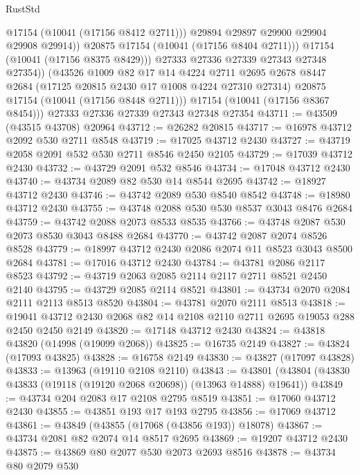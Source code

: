 \begin{lexlean}{RustStd}
\begin{coremodule}
                    @17154
                    (@10041 (@17156 @8412 @2711)))
                  @29894
                  @29897
                  @29900
                  @29904
                  @29908
                  @29914))
              @20875
              @17154
              (@10041 (@17156 @8404 @2711)))
            @17154
            (@10041 (@17156 @8375 @8429)))
          @27333
          @27336
          @27339
          @27343
          @27348
          @27354))
      (@43526
        @1009
        @82
        @17
        @14
        @4224
        @2711
        @2695
        @2678
        @8447
        @2684
        (@17125 @20815 @2430 @17 @1008 @4224 @27310 @27314)
        @20875
        @17154
        (@10041 (@17156 @8448 @2711)))
      @17154
      (@10041 (@17156 @8367 @8454)))
    @27333
    @27336
    @27339
    @27343
    @27348
    @27354
@43711 := @43509 (@43515 @43708) @20964
@43712 := @26282 @20815
@43717 := @16978 @43712 @2092 @530 @2711 @8548
@43719 := @17025 @43712 @2430
@43727 := @43719 @2058 @2091 @532 @530 @2711 @8546 @2450 @2105
@43729 := @17039 @43712 @2430
@43732 := @43729 @2091 @532 @8546
@43734 := @17048 @43712 @2430
@43740 := @43734 @2089 @82 @530 @14 @8544 @2695
@43742 := @18927 @43712 @2430
@43746 := @43742 @2089 @530 @8540 @8542
@43748 := @18980 @43712 @2430
@43755 := @43748 @2088 @530 @530 @8537 @3043 @8476 @2684
@43759 := @43742 @2088 @2073 @8533 @8535
@43766 := @43748 @2087 @530 @2073 @8530 @3043 @8488 @2684
@43770 := @43742 @2087 @2074 @8526 @8528
@43779 := @18997 @43712 @2430 @2086 @2074 @11 @8523 @3043 @8500 @2684
@43781 := @17016 @43712 @2430
@43784 := @43781 @2086 @2117 @8523
@43792 := @43719 @2063 @2085 @2114 @2117 @2711 @8521 @2450 @2140
@43795 := @43729 @2085 @2114 @8521
@43801 := @43734 @2070 @2084 @2111 @2113 @8513 @8520
@43804 := @43781 @2070 @2111 @8513
@43818 := @19041 @43712 @2430 @2068 @82 @14 @2108 @2110 @2711 @2695 @19053 @288 @2450 @2450 @2149
@43820 := @17148 @43712 @2430
@43824 := @43818 @43820 (@14998 (@19099 @2068))
@43825 := @16735 @2149
@43827 := @43824 (@17093 @43825)
@43828 := @16758 @2149
@43830 := @43827 (@17097 @43828)
@43833 := @13963 (@19110 @2108 @2110)
@43843 := @43801 (@43804 (@43830 @43833 (@19118 (@19120 @2068 @20698)) (@13963 @14888) @19641))
@43849 := @43734 @204 @2083 @17 @2108 @2795 @8519
@43851 := @17060 @43712 @2430
@43855 := @43851 @193 @17 @193 @2795
@43856 := @17069 @43712
@43861 := @43849 (@43855 (@17068 (@43856 @193)) @18078)
@43867 := @43734 @2081 @82 @2074 @14 @8517 @2695
@43869 := @19207 @43712 @2430
@43875 := @43869 @80 @2077 @530 @2073 @2693 @8516
@43878 := @43734 @80 @2079 @530

\end{coremodule}
\end{lexlean}
